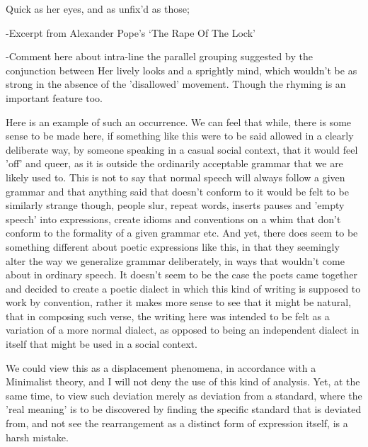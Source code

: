 \documentclass[]{article}
\begin{document}
Quick as her eyes, and as unfix’d as those;

-Excerpt from Alexander Pope’s ‘The Rape Of The Lock’



-Comment here about intra-line the parallel grouping suggested by the conjunction between Her lively looks and  a sprightly mind, which wouldn't be as strong in the absence of the 'disallowed' movement. Though the rhyming is an important feature too.



Here is an example of such an occurrence. We can feel that while, there is some sense to be made here, if something like this were to be said allowed in a clearly deliberate way, by someone speaking in a casual social context, that it would feel 'off' and queer, as it is outside the ordinarily acceptable grammar that we are likely used to. This is not to say that normal speech will always follow a given grammar and that anything said that doesn't conform to it would be felt to be similarly strange though, people slur, repeat words, inserts pauses and 'empty speech' into expressions, create idioms and conventions on a whim that don't conform to the formality of a given grammar etc. And yet, there does seem to be something different about poetic expressions like this, in that they seemingly alter the way we generalize grammar deliberately, in ways that wouldn't come about in ordinary speech. It doesn't seem to be the case the poets came together and decided to create a poetic dialect in which this kind of writing is supposed to work by convention, rather it makes more sense to see that it might be natural, that in composing such verse, the writing here was intended to be felt as a variation of a more normal dialect, as opposed to being an independent dialect in itself that might be used in a social context.



We could view this as a displacement phenomena, in accordance with a Minimalist theory, and I will not deny the use of this kind of analysis. Yet, at the same time, to view such deviation merely as deviation from a standard, where the 'real meaning' is to be discovered by finding the specific standard that is deviated from, and not see the rearrangement as a distinct form of expression itself, is a harsh mistake.
\end{document}
